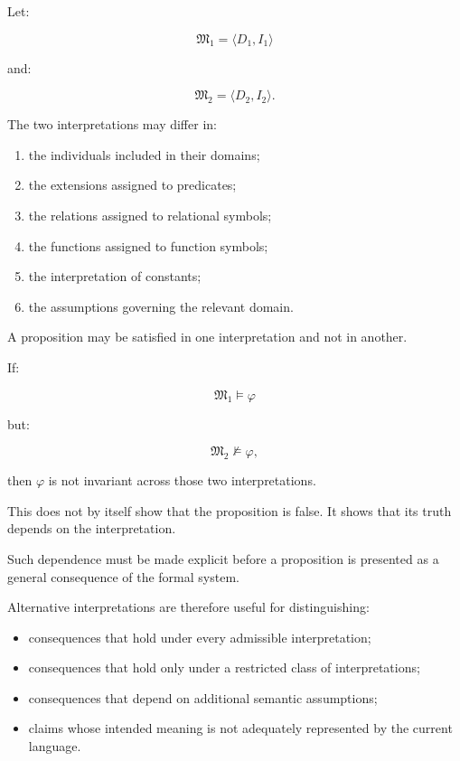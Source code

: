 Let:

\[
    \mathfrak{M}_1 = \langle D_1,I_1\rangle
\]

and:

\[
    \mathfrak{M}_2 = \langle D_2,I_2\rangle.
\]

The two interpretations may differ in:

\begin{enumerate}
    \item the individuals included in their domains;
    \item the extensions assigned to predicates;
    \item the relations assigned to relational symbols;
    \item the functions assigned to function symbols;
    \item the interpretation of constants;
    \item the assumptions governing the relevant domain.
\end{enumerate}

A proposition may be satisfied in one interpretation
and not in another.

If:

\[
    \mathfrak{M}_1 \models \varphi
\]

but:

\[
    \mathfrak{M}_2 \not\models \varphi,
\]

then \(\varphi\) is not invariant across those two
interpretations.

This does not by itself show that the proposition
is false. It shows that its truth depends on the
interpretation.

Such dependence must be made explicit before a
proposition is presented as a general consequence
of the formal system.

Alternative interpretations are therefore useful
for distinguishing:

\begin{itemize}
    \item consequences that hold under every admissible
    interpretation;
    \item consequences that hold only under a restricted
    class of interpretations;
    \item consequences that depend on additional
    semantic assumptions;
    \item claims whose intended meaning is not adequately
    represented by the current language.
\end{itemize}

